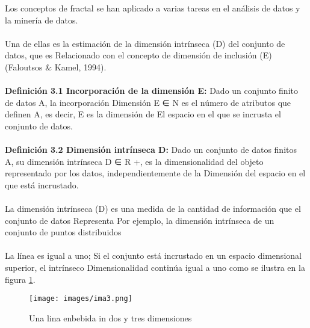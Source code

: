 Los conceptos de fractal se han aplicado a varias tareas en el análisis de datos y la minería de datos.
\\\\
Una de ellas es la estimación de la dimensión intrínseca (D) del conjunto de datos, que es
Relacionado con el concepto de dimensión de inclusión (E) (Faloutsos & Kamel, 1994).
\\\\
\textbf{Definición 3.1 Incorporación de la dimensión E:} Dado un conjunto finito de datos A, la incorporación
Dimensión E ∈ N es el número de atributos que definen A, es decir, E es la dimensión de
El espacio en el que se incrusta el conjunto de datos.
\\\\
\textbf{Definición 3.2 Dimensión intrínseca D:} Dado un conjunto de datos finitos A, su dimensión intrínseca
D ∈ R +, es la dimensionalidad del objeto representado por los datos, independientemente de la
Dimensión del espacio en el que está incrustado.
\\\\
La dimensión intrínseca (D) es una medida de la cantidad de información que el conjunto de datos
Representa Por ejemplo, la dimensión intrínseca de un conjunto de puntos distribuidos
\\\\
La línea es igual a uno; Si el conjunto está incrustado en un espacio dimensional superior, el intrínseco
Dimensionalidad continúa igual a uno como se ilustra en la figura \ref{fig:ima3}.


\begin{figure}[h]
\centering
\texttt{[image: images/ima3.png]}
\caption{Una lina enbebida in dos y tres dimensiones}
\label{fig:ima3}
\end{figure}


